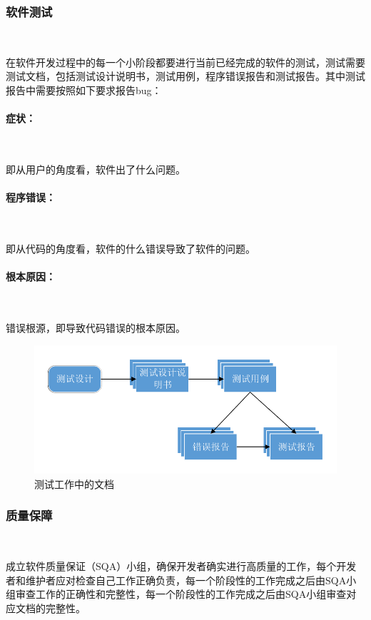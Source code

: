 \subsubsection{软件测试}\

在软件开发过程中的每一个小阶段都要进行当前已经完成的软件的测试，测试需要测试文档，包括测试设计说明书，测试用例，程序错误报告和测试报告。其中测试报告中需要按照如下要求报告bug：

\paragraph{症状：}\

即从用户的角度看，软件出了什么问题。

\paragraph{程序错误：}\

即从代码的角度看，软件的什么错误导致了软件的问题。

\paragraph{根本原因：}\

错误根源，即导致代码错误的根本原因。

\begin{figure}[H]
	\centering
	\includegraphics[width=0.9\columnwidth]{figures/test_document}
	\caption{测试工作中的文档}
	\label{fg:test_document}
\end{figure}

\subsubsection{质量保障}\

成立软件质量保证（SQA）小组，确保开发者确实进行高质量的工作，每个开发者和维护者应对检查自己工作正确负责，每一个阶段性的工作完成之后由SQA小组审查工作的正确性和完整性，每一个阶段性的工作完成之后由SQA小组审查对应文档的完整性。

